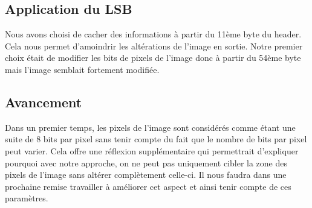 \subsection{Application du LSB}
Nous avons choisi de cacher des informations à partir du 11ème byte du header. 
Cela nous permet d'amoindrir les altérations de l'image en sortie.
Notre premier choix était de modifier les bits de pixels de l'image donc à partir du 54ème byte mais l'image semblait fortement modifiée.

\subsection{Avancement}
Dans un premier temps, les pixels de l'image sont considérés comme étant une suite de 8 bits par pixel sans tenir compte du fait que le nombre de bits par pixel peut varier.
Cela offre une réflexion supplémentaire qui permettrait d'expliquer pourquoi avec notre approche, on ne peut pas uniquement cibler la zone des pixels de l'image sans altérer complètement celle-ci.
Il nous faudra dans une prochaine remise travailler à améliorer cet aspect et ainsi tenir compte de ces paramètres.
